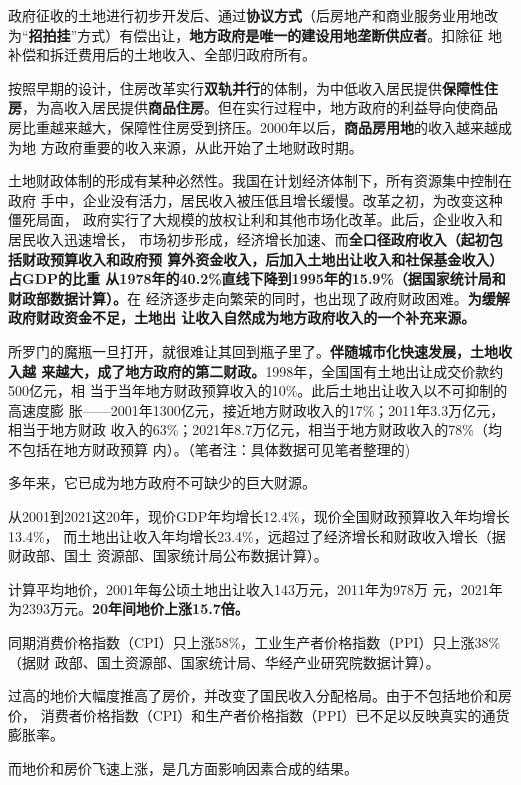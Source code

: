政府征收的土地进行初步开发后、通过\textbf{协议方式}（后房地产和商业服务业用地改
为“\textbf{招拍挂}”方式）有偿出让，\textbf{地方政府是唯一的建设用地垄断供应者}。扣除征
地补偿和拆迁费用后的土地收入、全部归政府所有。

按照早期的设计，住房改革实行\textbf{双轨并行}的体制，为中低收入居民提供\textbf{保障性住
  房}，为高收入居民提供\textbf{商品住房}。但在实行过程中，地方政府的利益导向使商品
房比重越来越大，保障性住房受到挤压。2000年以后，\textbf{商品房用地}的收入越来越成为地
方政府重要的收入来源，从此开始了土地财政时期。

土地财政体制的形成有某种必然性。我国在计划经济体制下，所有资源集中控制在政府
手中，企业没有活力，居民收入被压低且增长缓慢。改革之初，为改变这种僵死局面，
政府实行了大规模的放权让利和其他市场化改革。此后，企业收入和居民收入迅速增长，
市场初步形成，经济增长加速、而\textbf{全口径政府收入（起初包括财政预算收入和政府预
  算外资金收入，后加入土地出让收入和社保基金收入）占GDP的比重
  从1978年的40.2\%直线下降到1995年的15.9\%（据国家统计局和财政部数据计算）。}在
经济逐步走向繁荣的同时，也出现了政府财政困难。\textbf{为缓解政府财政资金不足，土地出
让收入自然成为地方政府收入的一个补充来源。}

所罗门的魔瓶一旦打开，就很难让其回到瓶子里了。\textbf{伴随城市化快速发展，土地收入越
来越大，成了地方政府的第二财政。}1998年，全国国有土地出让成交价款约500亿元，相
当于当年地方财政预算收入的10\%。此后土地出让收入以不可抑制的高速度膨
胀——2001年1300亿元，接近地方财政收入的17\%；2011年3.3万亿元，相当于地方财政
收入的63\%；2021年8.7万亿元，相当于地方财政收入的78\%（均不包括在地方财政预算
内）。（笔者注：具体数据可见笔者整理的)

多年来，它已成为地方政府不可缺少的巨大财源。

从2001到2021这20年，现价GDP年均增长12.4\%，现价全国财政预算收入年均增长13.4\%，
而土地出让收入年均增长23.4\%，远超过了经济增长和财政收入增长（据财政部、国土
资源部、国家统计局公布数据计算）。

计算平均地价，2001年每公顷土地出让收入143万元，2011年为978万
元，2021年为2393万元。\textbf{20年间地价上涨15.7倍。}

同期消费价格指数（CPI）只上涨58\%，工业生产者价格指数（PPI）只上涨38\%（据财
政部、国土资源部、国家统计局、华经产业研究院数据计算）。

过高的地价大幅度推高了房价，并改变了国民收入分配格局。由于不包括地价和房价，
消费者价格指数（CPI）和生产者价格指数（PPI）已不足以反映真实的通货膨胀率。

而地价和房价飞速上涨，是几方面影响因素合成的结果。

